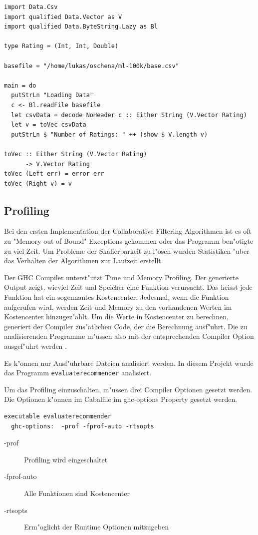 \documentclass[a4paper, 12pt]{article}
\begin{document}
\begin{lstlisting}[label={lst:readio},caption={Einlesen von Files mit ByteString}]
import Data.Csv
import qualified Data.Vector as V
import qualified Data.ByteString.Lazy as Bl

type Rating = (Int, Int, Double)

basefile = "/home/lukas/oschena/ml-100k/base.csv"

main = do
  putStrLn "Loading Data"
  c <- Bl.readFile basefile
  let csvData = decode NoHeader c :: Either String (V.Vector Rating)
  let v = toVec csvData
  putStrLn $ "Number of Ratings: " ++ (show $ V.length v)

toVec :: Either String (V.Vector Rating)
      -> V.Vector Rating
toVec (Left err) = error err
toVec (Right v) = v
\end{lstlisting}

\subsection{Profiling}
\label{sec:profiling}

Bei den ersten Implementation der Collaborative Filtering Algorithmen ist es oft zu "Memory out of Bound" Exceptions gekommen oder das Programm ben"otigte zu viel Zeit. Um Probleme der Skalierbarkeit zu l"osen wurden Statistiken "uber das Verhalten der Algorithmen zur Laufzeit erstellt.

Der GHC Compiler unterst"utzt Time und Memory Profiling. Der generierte Output zeigt, wieviel Zeit und Speicher eine Funktion verursacht. Das heisst jede Funktion hat ein sogennantes Kostencenter. Jedesmal, wenn die Funktion aufgerufen wird, werden Zeit und Memory zu den vorhandenen Werten im Kostencenter hinzugez"ahlt. Um die Werte in Kostencenter zu berechnen, generiert der Compiler zus"atlichen Code, der die Berechnung ausf"uhrt. Die zu analisierenden Programme m"ussen also mit der entsprechenden Compiler Option ausgef"uhrt werden \cite{Mena}.

Es k"onnen nur Ausf"uhrbare Dateien analisiert werden. In diesem Projekt wurde das Programm \verb|evaluaterecommender| analisiert.

Um das Profiling einzuschalten, m"ussen drei Compiler Optionen gesetzt werden. Die Optionen k"onnen im Cabalfile im ghc-options Property gesetzt werden.
\begin{verbatim}
executable evaluaterecommender
  ghc-options:	-prof -fprof-auto -rtsopts
\end{verbatim}
\begin{description}
\item[-prof] Profiling wird eingeschaltet
\item[-fprof-auto] Alle Funktionen sind Kostencenter
\item[-rtsopts] Erm"oglicht der Runtime Optionen mitzugeben
\end{description}
\end{document}
